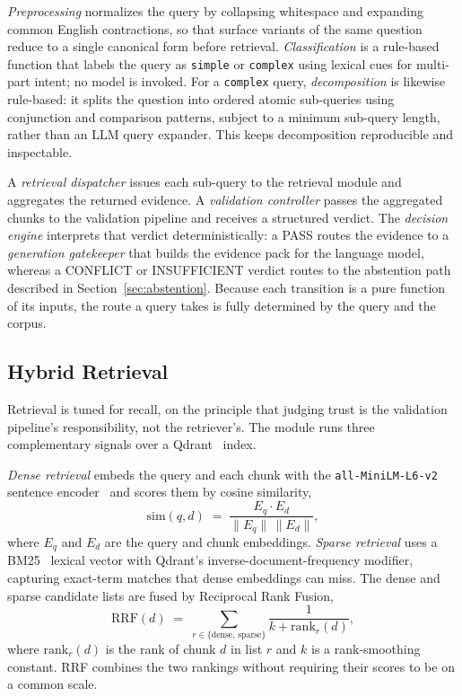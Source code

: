 \documentclass[conference]{IEEEtran}
\begin{document}
\textit{Preprocessing} normalizes the query by collapsing whitespace and
expanding common English contractions, so that surface variants of the
same question reduce to a single canonical form before retrieval.
\textit{Classification} is a rule-based function that labels the query as
\texttt{simple} or \texttt{complex} using lexical cues for multi-part
intent; no model is invoked. For a \texttt{complex} query,
\textit{decomposition} is likewise rule-based: it splits the question into
ordered atomic sub-queries using conjunction and comparison patterns,
subject to a minimum sub-query length, rather than an LLM query expander.
This keeps decomposition reproducible and inspectable.

A \textit{retrieval dispatcher} issues each sub-query to the retrieval
module and aggregates the returned evidence. A \textit{validation
controller} passes the aggregated chunks to the validation pipeline and
receives a structured verdict. The \textit{decision engine} interprets
that verdict deterministically: a PASS routes the evidence to a
\textit{generation gatekeeper} that builds the evidence pack for the
language model, whereas a CONFLICT or INSUFFICIENT verdict routes to the
abstention path described in Section~\ref{sec:abstention}. Because each
transition is a pure function of its inputs, the route a query takes is
fully determined by the query and the corpus.

\subsection{Hybrid Retrieval}
\label{sec:retrieval}
Retrieval is tuned for recall, on the principle that judging trust is the
validation pipeline's responsibility, not the retriever's. The module runs
three complementary signals over a Qdrant~\cite{qdrant} index.

\textit{Dense retrieval} embeds the query and each chunk with the
\texttt{all-MiniLM-L6-v2} sentence encoder~\cite{reimers2019sbert} and
scores them by cosine similarity,
\begin{equation}
\mathrm{sim}(q,d) \;=\; \frac{E_q \cdot E_d}{\lVert E_q\rVert\,\lVert E_d\rVert},
\label{eq:cosine}
\end{equation}
where $E_q$ and $E_d$ are the query and chunk embeddings. \textit{Sparse
retrieval} uses a BM25~\cite{robertson2009bm25} lexical vector with Qdrant's
inverse-document-frequency modifier, capturing exact-term matches that dense
embeddings can miss.
The dense and sparse candidate lists are fused by Reciprocal Rank Fusion,
\begin{equation}
\mathrm{RRF}(d) \;=\; \sum_{r \in \{\text{dense},\,\text{sparse}\}}
\frac{1}{k + \mathrm{rank}_r(d)},
\label{eq:rrf}
\end{equation}
where $\mathrm{rank}_r(d)$ is the rank of chunk $d$ in list $r$ and $k$ is
a rank-smoothing constant. RRF combines the two rankings without requiring
their scores to be on a common scale.
\end{document}
